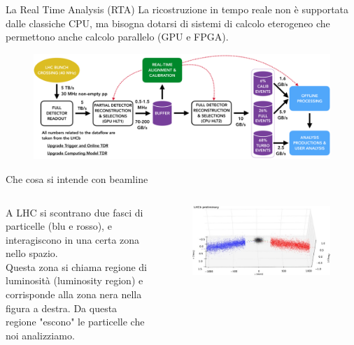 \documentclass[
10pt,
aspectratio=169,
]{beamer}
\begin{document}
\begin{frame}{La Real Time Analysis (RTA)}
La ricostruzione in tempo reale non è supportata dalle classiche CPU, ma bisogna dotarsi di sistemi di calcolo eterogeneo che permettono anche calcolo parallelo (GPU e FPGA).
\begin{figure}
    \centering
    \includegraphics[width=\textwidth]{hidef_RTA_dataflow_widescreen.png}
\end{figure}
    
\end{frame}
\begin{frame}{Che cosa si intende con beamline}
\begin{columns}
    A LHC si scontrano due fasci di particelle (blu e rosso), e interagiscono in una certa zona nello spazio.\\
    \vspace{0.5cm}
    Questa zona si chiama regione di luminosità (luminosity region) e corrisponde alla zona nera nella figura a destra. Da questa regione "escono" le particelle che noi analizziamo.\\

\begin{figure}
    \centering
    \includegraphics[width=\textwidth]{bgi-transformed.jpeg}
\end{figure}
    \end{columns}

\end{frame}
\end{document}
